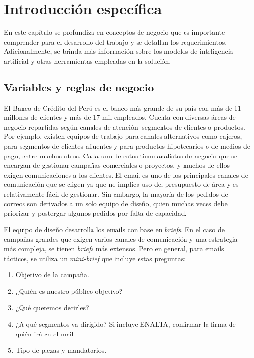 \chapter{Introducción específica} %

\label{Chapter2}

En este capítulo se profundiza en conceptos de negocio que es importante comprender para el desarrollo del trabajo y se detallan los requerimientos. Adicionalmente, se brinda más información sobre los modelos de inteligencia artificial y otras herramientas empleadas en la solución.

\section{Variables y reglas de negocio}
\label{sec:Negocio}

El Banco de Crédito del Perú es el banco más grande de su país con más de 11 millones de clientes y más de 17 mil empleados. Cuenta con diversas áreas de negocio repartidas según canales de atención, segmentos de clientes o productos. Por ejemplo, existen equipos de trabajo para canales alternativos como cajeros, para segmentos de clientes afluentes y para productos hipotecarios o de medios de pago, entre muchos otros. Cada uno de estos tiene analistas de negocio que se encargan de gestionar campañas comerciales o proyectos, y muchos de ellos exigen comunicaciones a los clientes. El email es uno de los principales canales de comunicación que se eligen ya que no implica uso del presupuesto de área y es relativamente fácil de gestionar. Sin embargo, la mayoría de los pedidos de correos son derivados a un solo equipo de diseño, quien muchas veces debe priorizar y postergar algunos pedidos por falta de capacidad.

El equipo de diseño desarrolla los emails con base en \textit{briefs}. En el caso de campañas grandes que exigen varios canales de comunicación y una estrategia más compleja, se tienen \textit{briefs} más extensos. Pero en general, para emails tácticos, se utiliza un \textit{mini-brief} que incluye estas preguntas:

\begin{enumerate}
    \item Objetivo de la campaña.
    \item ¿Quién es nuestro público objetivo?
    \item ¿Qué queremos decirles?
    \item ¿A qué segmentos va dirigido? Si incluye ENALTA, confirmar la firma de quién irá en el mail.
    \item Tipo de piezas y mandatorios.
\end{enumerate}

